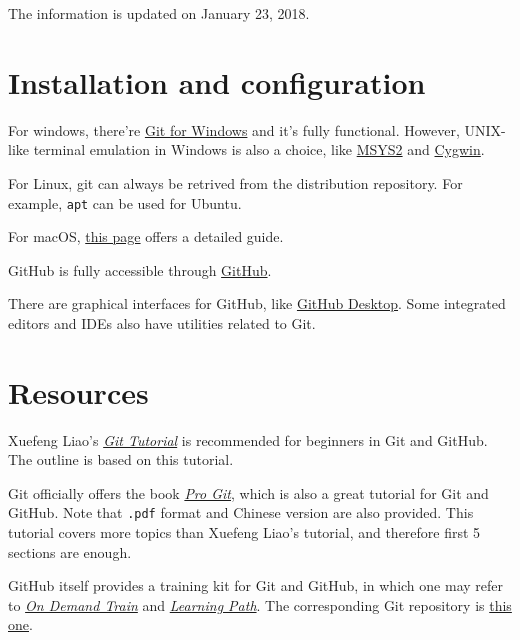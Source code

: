 \documentclass[english]{../TeXTemplate/pkupaper}
\title{\titlemark}
\author{pppppass}
\date{January 23, 2018}
\begin{document}
\maketitle

The information is updated on January 23, 2018.

\section{Installation and configuration}

For windows, there're \href{https://git-for-windows.github.io/}{Git for Windows} and it's fully functional. However, UNIX-like terminal emulation in Windows is also a choice, like \href{http://www.msys2.org/}{MSYS2} and \href{https://www.cygwin.com/}{Cygwin}.

For Linux, git can always be retrived from the distribution repository. For example, \verb"apt" can be used for Ubuntu.

For macOS, \href{https://git-scm.com/book/en/v2/Getting-Started-Installing-Git}{this page} offers a detailed guide.

GitHub is fully accessible through \href{https://github.com/}{GitHub}.

There are graphical interfaces for GitHub, like \href{https://desktop.github.com/}{GitHub Desktop}. Some integrated editors and IDEs also have utilities related to Git.

\section{Resources}

Xuefeng Liao's \href{https://www.liaoxuefeng.com/wiki/0013739516305929606dd18361248578c67b8067c8c017b000/}{\emph{Git Tutorial}} is recommended for beginners in Git and GitHub. The outline is based on this tutorial.

Git officially offers the book \href{https://git-scm.com/book/en/v2}{\emph{Pro Git}}, which is also a great tutorial for Git and GitHub. Note that \verb".pdf" format and Chinese version are also provided. This tutorial covers more topics than Xuefeng Liao's tutorial, and therefore first 5 sections are enough.

GitHub itself provides a training kit for Git and GitHub, in which one may refer to \href{https://services.github.com/on-demand/}{\emph{On Demand Train}} and \href{https://services.github.com/on-demand/resources/learning-path/}{\emph{Learning Path}}. The corresponding Git repository is \href{https://github.com/github/training-kit}{this one}.
\end{document}
